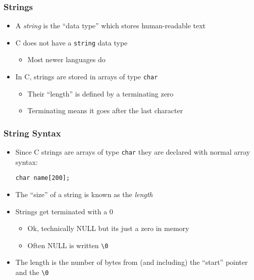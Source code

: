 \documentclass[14pt]{beamer}
\begin{document}
\begin{frame}
\frametitle{Strings}
\begin{itemize}
\item A \textit{string} is the ``data type'' which stores human-readable text
\item C does not have a \texttt{string} data type
	\begin{itemize}
		\item Most newer languages do
	\end{itemize}
\item In C, strings are stored in arrays of type \texttt{char}
	\begin{itemize}
		\item Their ``length'' is defined by a terminating zero
		\item Terminating means it goes after the last character
	\end{itemize}
\end{itemize}
\end{frame}

\begin{frame}[fragile]
\frametitle{String Syntax}
\begin{itemize}
\item Since C strings are arrays of type \texttt{char} they are declared with normal array syntax:
\begin{lstlisting}[style=CStyle]
char name[200];
\end{lstlisting}
\item The ``size'' of a string is known as the \textit{length}
\item Strings get terminated with a 0
	\begin{itemize}
		\item Ok, technically NULL but its just a zero in memory
		\item Often NULL is written \texttt{\textbackslash 0}
	\end{itemize}
\item The length is the number of bytes from (and including) the ``start'' pointer and the \texttt{\textbackslash 0}
\end{itemize}
\end{frame}
\end{document}
